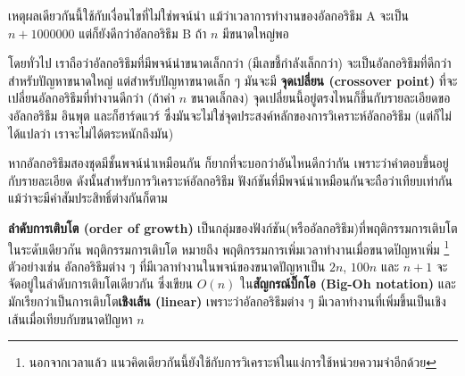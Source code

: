 เหตุผลเดียวกันนี้ใช้กับเงื่อนไขที่ไม่ใช่พจน์นำ แม้ว่าเวลาการทำงานของอัลกอริธึม A จะเป็น {\scriptsize$n+1000000$} 
แต่ก็ยังดีกว่าอัลกอริธึม B ถ้า {\scriptsize$n$} มีขนาดใหญ่พอ


โดยทั่วไป เราถือว่าอัลกอริธึมที่มีพจน์นำขนาดเล็กกว่า (มีเลขชี้กำลังเล็กกว่า) จะเป็นอัลกอริธึมที่ดีกว่าสำหรับปัญหาขนาดใหญ่ 
แต่สำหรับปัญหาขนาดเล็ก ๆ มันจะมี \textbf{จุดเปลี่ยน (crossover point)} ที่จะเปลี่ยนอัลกอริธึมที่ทำงานดีกว่า (ถ้าค่า {\scriptsize$n$} ขนาดเล็กลง)
จุดเปลี่ยนนี้อยู่ตรงไหนก็ขึ้นกับรายละเอียดของอัลกอริธึม อินพุต และก็ฮาร์ดแวร์
ซึ่งมันจะไม่ใช่จุดประสงค์หลักของการวิเคราะห์อัลกอริธึม (แต่ก็ไม่ได้แปลว่า เราจะไม่ได้ตระหนักถึงมัน)


หากอัลกอริธึมสองชุดมีชั้นพจน์นำเหมือนกัน ก็ยากที่จะบอกว่าอันไหนดีกว่ากัน เพราะว่าคำตอบขึ้นอยู่กับรายละเอียด 
ดังนั้นสำหรับการวิเคราะห์อัลกอริธึม ฟังก์ชันที่มีพจน์นำเหมือนกันจะถือว่าเทียบเท่ากัน แม้ว่าจะมีค่าสัมประสิทธิ์ต่างกันก็ตาม



\textbf{ลำดับการเติบโต (order of growth)}
เป็นกลุ่มของฟังก์ชัน(หรืออัลกอริธึม)ที่พฤติกรรมการเติบโตในระดับเดียวกัน
พฤติกรรมการเติบโต หมายถึง พฤติกรรมการเพิ่มเวลาทำงานเมื่อขนาดปัญหาเพิ่ม%
\footnote{นอกจากเวลาแล้ว
แนวคิดเดียวกันนี้ยังใช้กับการวิเคราะห์ในแง่การใช้หน่วยความจำอีกด้วย
}
ตัวอย่างเช่น
อัลกอริธึมต่าง ๆ ที่มีเวลาทำงานในพจน์ของขนาดปัญหาเป็น {\scriptsize$2n$}, {\scriptsize$100n$} และ {\scriptsize$n+1$}
จะจัดอยู่ในลำดับการเติบโตเดียวกัน ซึ่งเขียน {\scriptsize$O(n)$} ใน{\bf สัญกรณ์บิ๊กโอ (Big-Oh notation)} และมักเรียกว่าเป็นการเติบโต{\bf เชิงเส้น (linear)}
เพราะว่าอัลกอริธึมต่าง ๆ มีเวลาทำงานที่เพิ่มขึ้นเป็นเชิงเส้นเมื่อเทียบกับขนาดปัญหา {\scriptsize$n$}

